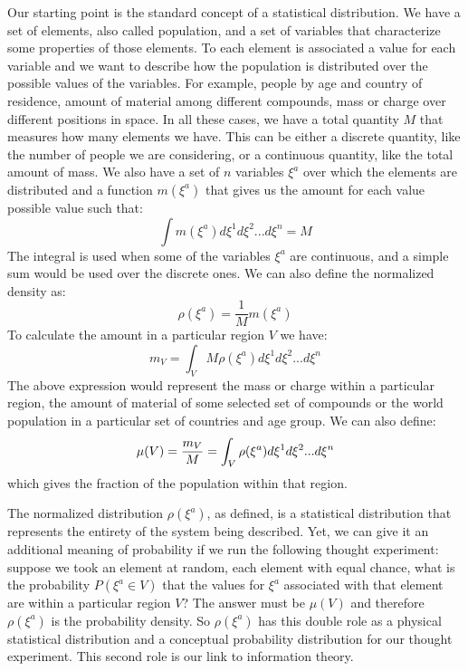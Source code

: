\documentclass[11pt]{article}
\begin{document}
Our starting point is the standard concept of a statistical distribution. We have a set of elements, also called population, and a set of variables that characterize some properties of those elements. To each element is associated a value for each variable and we want to describe how the population is distributed over the possible values of the variables. For example, people by age and country of residence, amount of material among different compounds, mass or charge over different positions in space. In all these cases, we have a total quantity $M$ that measures how many elements we have. This can be either a discrete quantity, like the number of people we are considering, or a continuous quantity, like the total amount of mass. We also have a set of $n$ variables $\xi^a$ over which the elements are distributed and a function $m(\xi^a)$ that gives us the amount for each value possible value such that:
\begin{equation}
\int m(\xi^a) d\xi^1 d\xi^2 ... d\xi^n = M
\end{equation}
The integral is used when some of the variables $\xi^a$ are continuous, and a simple sum would be used over the discrete ones. We can also define the normalized density as:
\begin{equation}
\rho(\xi^a) = \frac{1}{M}m(\xi^a)
\end{equation}
To calculate the amount in a particular region $V$ we have:
\begin{equation}
m_V = \int_V M \rho(\xi^a) d\xi^1 d\xi^2 ... d\xi^n
\end{equation}
The above expression would represent the mass or charge within a particular region, the amount of material of some selected set of compounds or the world population in a particular set of countries and age group. We can also define:
\begin{equation}
\mu(V) =\frac{m_V}{M} = \int_V \rho(\xi^a) d\xi^1 d\xi^2 ... d\xi^n \\
\end{equation}
which gives the fraction of the population within that region.

The normalized distribution $\rho(\xi^a)$, as defined, is a statistical distribution that represents the entirety of the system being described. Yet, we can give it an additional meaning of probability if we run the following thought experiment: suppose we took an element at random, each element with equal chance, what is the probability $P(\xi^a \in V)$ that the values for $\xi^a$ associated with that element are within a particular region $V$? The answer must be $\mu(V)$ and therefore $\rho(\xi^a)$ is the probability density. So $\rho(\xi^a)$ has this double role as a physical statistical distribution and a conceptual probability distribution for our thought experiment. This second role is our link to information theory.
\end{document}

